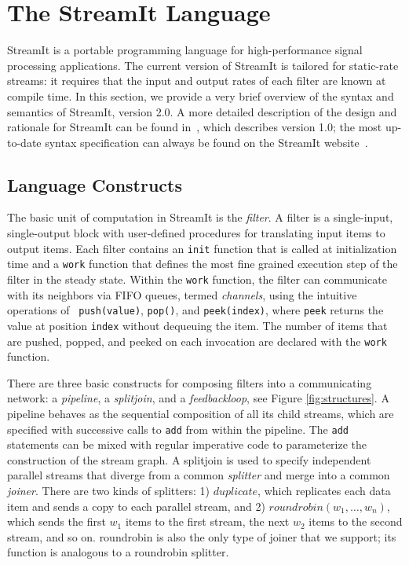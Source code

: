 \section{The StreamIt Language}
\label{sec:streamit}

StreamIt is a portable programming language for high-performance
signal processing applications.  The current version of StreamIt is
tailored for static-rate streams: it requires that the input and
output rates of each filter are known at compile time.  In this
section, we provide a very brief overview of the syntax and semantics
of StreamIt, version 2.0.  A more detailed description of the design
and rationale for StreamIt can be found in~\cite{streamitcc}, which
describes version 1.0; the most up-to-date syntax specification can
always be found on the StreamIt website~\cite{streamitweb}.

\subsection{Language Constructs}

The basic unit of computation in StreamIt is the {\it filter}.  A
filter is a single-input, single-output block with user-defined
procedures for translating input items to output items.  Each filter
contains an {\tt init} function that is called at initialization time
and a {\tt work} function that defines the most fine grained execution
step of the filter in the steady state.  Within the {\tt work}
function, the filter can communicate with its neighbors via FIFO
queues, termed {\it channels}, using the intuitive operations of {\tt
push(value)}, {\tt pop()}, and {\tt peek(index)}, where {\tt peek}
returns the value at position {\tt index} without dequeuing the item.
The number of items that are pushed, popped, and peeked on each
invocation are declared with the {\tt work} function.

There are three basic constructs for composing filters into a
communicating network: a {\it pipeline}, a {\it splitjoin}, and a {\it
feedbackloop}, see Figure \ref{fig:structures}.  A pipeline behaves as
the sequential composition of all its child streams, which are
specified with successive calls to {\tt add} from within the pipeline.
The {\tt add} statements can be mixed with regular imperative code to
parameterize the construction of the stream graph. A splitjoin is used
to specify independent parallel streams that diverge from a common
{\it splitter} and merge into a common {\it joiner}.  There are two
kinds of splitters: 1) $duplicate$, which replicates each data item
and sends a copy to each parallel stream, and 2) $roundrobin(w_1,
\dots, w_n)$, which sends the first $w_1$ items to the first stream,
the next $w_2$ items to the second stream, and so on. roundrobin is
also the only type of joiner that we support; its function is
analogous to a roundrobin splitter.

